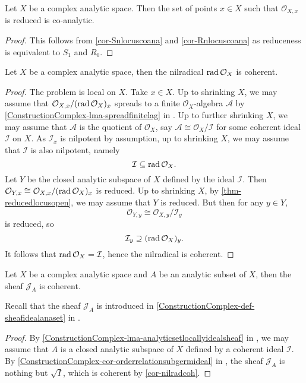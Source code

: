 \begin{thm}\label{thm-reducedlocusopen}
    Let $X$ be a complex analytic space. Then the set of points $x\in X$ such that $\mathcal{O}_{X,x}$ is reduced is co-analytic.
\end{thm}
\begin{proof}
    This follows from \cref{cor-Snlocuscoana} and \cref{cor-Rnlocuscoana} as reduceness is equivalent to $S_1$ and $R_0$.
\end{proof}

\begin{corollary}\label{cor-nilradcoh}
    Let $X$ be a complex analytic space, then the nilradical $\operatorname{rad} \mathcal{O}_X$ is coherent.
\end{corollary}
\begin{proof}
    The problem is local on $X$. Take $x\in X$. Up to shrinking $X$, we may assume that $\mathcal{O}_{X,x}/(\operatorname{rad} \mathcal{O}_X)_x$ spreads to a finite $\mathcal{O}_X$-algebra $\mathcal{A}$ by \cref{ConstructionComplex-lma-spreadfinitelag} in . Up to further shrinking $X$, we may assume that $\mathcal{A}$ is the quotient of $\mathcal{O}_X$, say $\mathcal{A}\cong \mathcal{O}_X/\mathcal{I}$ for some coherent ideal $\mathcal{I}$ on $X$. As $\mathcal{I}_x$ is nilpotent by assumption, up to shrinking $X$, we may assume that $\mathcal{I}$ is also nilpotent, namely
    \[
        \mathcal{I}\subseteq  \operatorname{rad} \mathcal{O}_X. 
    \]
    Let $Y$ be the closed analytic subspace of $X$ defined by the ideal $\mathcal{I}$. Then $\mathcal{O}_{Y,x}\cong \mathcal{O}_{X,x}/(\operatorname{rad} \mathcal{O}_X)_x$ is reduced. Up to shrinking $X$, by \cref{thm-reducedlocusopen}, we may assume that $Y$ is reduced. But then for any $y\in Y$, 
    \[
        \mathcal{O}_{Y,y}\cong \mathcal{O}_{X,y}/\mathcal{I}_y
    \]
    is reduced, so
    \[
        \mathcal{I}_y\supseteq   (\operatorname{rad} \mathcal{O}_X)_y.
    \] 
    It follows that $\operatorname{rad} \mathcal{O}_X=\mathcal{I}$, hence the nilradical is coherent.
\end{proof}

\begin{corollary}\label{cor-CartanOka}
    Let $X$ be a complex analytic space and $A$ be an analytic subset of $X$, then the sheaf $\mathcal{J}_A$ is coherent.
\end{corollary}
Recall that the sheaf $\mathcal{J}_A$ is introduced in \cref{ConstructionComplex-def-sheafidealanaset} in .
\begin{proof}
By   \cref{ConstructionComplex-lma-analyticsetlocallyidealsheaf} in , we may assume that $A$ is a closed analytic subspace of $X$ defined by a coherent ideal $\mathcal{I}$. By \cref{ConstructionComplex-cor-orderrelationsubgermideal} in , the sheaf $\mathcal{J}_A$ is nothing but $\sqrt{I}$, which is coherent by \cref{cor-nilradcoh}.
\end{proof}

